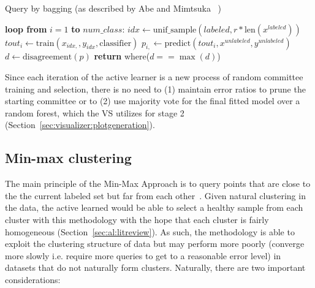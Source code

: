 \tablespacing
\begin{algorithm}[H]
	\caption{Query by bagging (as described by Abe and Mimtsuka 
	~\cite{abe1998})}\label{euclid}
	\begin{algorithmic}[1]
		\State \textbf{loop from} $i=1$ \textbf{to} $num\_class$:
		\State \indent $idx \gets \text{unif\_sample}(labeled, 
		r*\text{len}(x^{labeled}) )$
		\State \indent $\textit{tout}_{i} \gets 
		\text{train}(x_{idx, },y_{idx},\text{classifier})$
		\State \indent $p_{i,} \gets 
		\text{predict}(\textit{tout}_i,x^{unlabeled},y^{unlabeled})$
		\State $d \gets \text{disagreement}(p)$
		\State \textbf{return} where($d==\max{(d)}$)
		\EndProcedure
	\end{algorithmic}
\end{algorithm}
\bodyspacing

Since each iteration of the active learner is a new process of random committee 
training and selection, there is no need to (1) maintain error ratios to prune 
the starting committee or to (2) use majority vote for the final 
fitted model over a random forest, which the VS utilizes for stage 
2 (Section~\ref{sec:visualizer:plotgeneration}).










\subsection{Min-max clustering}
\label{sec:al:methods:clustering}

The main principle of the Min-Max Approach is to query points that are close to 
the the current labeled set but far from each other~\cite{vu2010}. Given 
natural clustering in the data, the active learned would be able to select a 
healthy sample from each cluster with this methodology with the hope that each 
cluster is fairly homogeneous (Section~\ref{sec:al:litreview}). As such, the 
methodology is able to exploit the clustering structure of data but may perform 
more poorly (converge more slowly i.e. require more queries to get to a 
reasonable error level) in datasets that do not naturally form clusters. 
Naturally, there are two important considerations:

